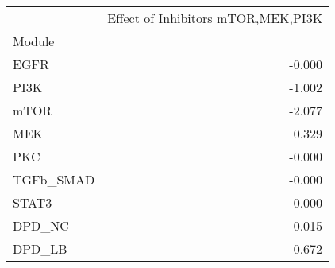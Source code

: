\begin{tabular}{lr}
\toprule
{} &  Effect of Inhibitors mTOR,MEK,PI3K \\
Module    &                                     \\
\midrule
EGFR      &                              -0.000 \\
PI3K      &                              -1.002 \\
mTOR      &                              -2.077 \\
MEK       &                               0.329 \\
PKC       &                              -0.000 \\
TGFb\_SMAD &                              -0.000 \\
STAT3     &                               0.000 \\
DPD\_NC    &                               0.015 \\
DPD\_LB    &                               0.672 \\
\bottomrule
\end{tabular}
